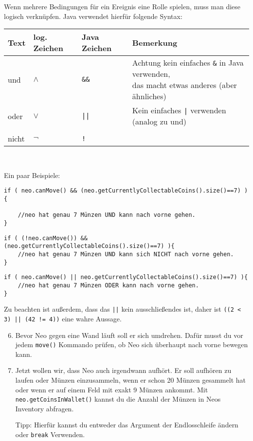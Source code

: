 \begin{Infobox}

	Wenn mehrere Bedingungen für ein Ereignis eine Rolle spielen, muss man diese logisch verknüpfen. 
	Java verwendet hierfür folgende Syntax:
	\begin{center}
		\begin{tabular}{ l | l | l | l}
			Text & log. Zeichen & Java Zeichen & Bemerkung \\ \hline
			und  & $\land$ & \texttt{\&\&} & \minibox{
					Achtung kein einfaches \texttt{\&} in Java verwenden,\\ 
					das macht etwas anderes (aber ähnliches)
			} \\
			oder & $\lor$ & \texttt{||} & Kein einfaches \texttt{|} verwenden (analog zu und) \\
			& &  \\
			nicht & $\neg$ & \texttt{!} &\\
		\end{tabular}\\
	\end{center}

	Ein paar Beispiele:

	\begin{lstlisting}[numbers=none]
if ( neo.canMove() && (neo.getCurrentlyCollectableCoins().size()==7) ){

	//neo hat genau 7 Münzen UND kann nach vorne gehen.
}
	\end{lstlisting}

	\begin{lstlisting}[numbers=none]
if ( (!neo.canMove()) && (neo.getCurrentlyCollectableCoins().size()==7) ){
	//neo hat genau 7 Münzen UND kann sich NICHT nach vorne gehen.
}
	\end{lstlisting}

	\begin{lstlisting}[numbers=none]
if ( neo.canMove() || neo.getCurrentlyCollectableCoins().size()==7) ){
	//neo hat genau 7 Münzen ODER kann nach vorne gehen.
}
	\end{lstlisting}

	Zu beachten ist außerdem, dass das  \lstinline{||} kein ausschließendes  ist, daher ist \lstinline{((2 < 3) || (42 != 4))} eine wahre Aussage.

\end{Infobox}


\begin{enumerate}\setcounter{enumi}{5}
	\item
		Bevor Neo gegen eine Wand läuft soll er sich umdrehen.
		Dafür musst du vor jedem \lstinline{move()} Kommando prüfen, ob Neo sich überhaupt nach vorne bewegen kann.

	\item
		Jetzt wollen wir, dass Neo auch irgendwann aufhört.
		Er soll aufhören zu laufen oder Münzen einzusammeln, wenn er schon 20 Münzen gesammelt hat oder wenn er auf einem Feld mit exakt 9 Münzen ankommt.
		Mit \lstinline{neo.getCoinsInWallet()} kannst du die Anzahl der Münzen in Neos Inventory abfragen.

		Tipp: Hierfür kannst du entweder das Argument der Endlosschleife ändern oder \lstinline{break} Verwenden.
\end{enumerate}
\newpage
